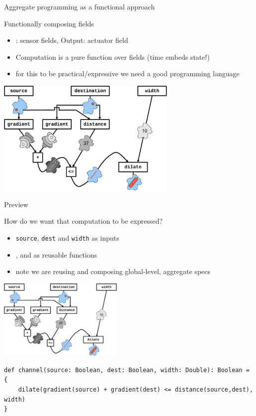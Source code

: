 \documentclass[presentation, 9pt]{beamer}\mode<presentation>{\usetheme{AMSBolognaFC}}
\begin{document}
\begin{frame}{Aggregate programming as a functional approach}
\begin{exampleblock}{Functionally composing fields}
\begin{itemize}
	\item {}: sensor fields, Output: actuator field
	\item Computation is a pure function over fields (time embeds state!)
	\item[\faArrowRight] for this to be practical/expressive we need a good programming language
\end{itemize}
\end{exampleblock}
\centering
\includegraphics[width=0.65\textwidth]{img/functions.pdf}
\end{frame}
\begin{frame}[fragile]{Preview}
	\begin{exampleblock}{How do we want that computation to be expressed?}
		\begin{itemize}
			\item \texttt{source}, \texttt{dest} and \texttt{width} as inputs
			\item {},  and  as reusable functions
			\item[\faArrowRight] note we are reusing and composing global-level, aggregate specs 
		\end{itemize}
	\end{exampleblock}
\centering
\includegraphics[width=0.45\textwidth]{img/functions.pdf}
\begin{verbatim}
def channel(source: Boolean, dest: Boolean, width: Double): Boolean = {
	dilate(gradient(source) + gradient(dest) <= distance(source,dest), width)
}
\end{verbatim}
\end{frame}
\end{document}
